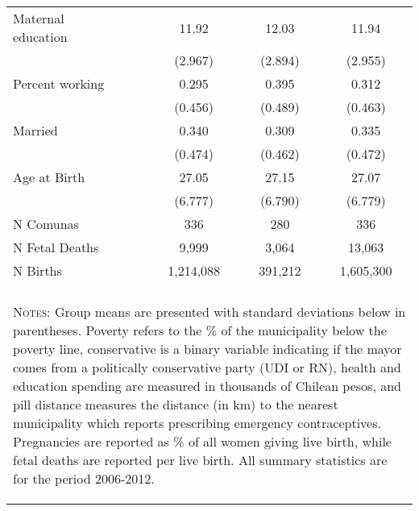 \begin{table}[htpb!]
\begin{tabular} {@{\extracolsep{5pt}}lp{3mm}ccc}
Maternal education  &&       11.92&       12.03&       11.94\\
&&     (2.967)&     (2.894)&     (2.955)\\
Percent working     &&       0.295&       0.395&       0.312\\
&&     (0.456)&     (0.489)&     (0.463)\\
Married     &&       0.340&       0.309&       0.335\\
&&     (0.474)&     (0.462)&     (0.472)\\
Age at Birth      &&       27.05&       27.15&       27.07\\
&&     (6.777)&     (6.790)&     (6.779)\\ \midrule
N Comunas &&336&280&336\\
N Fetal Deaths &&9,999&3,064&13,063\\
N Births &&1,214,088&391,212&1,605,300\\
\hline \hline \\[-1.8ex]
\multicolumn{5}{p{12cm}}{\begin{footnotesize}\textsc{Notes:}
Group means are presented with standard deviations below in
parentheses.  Poverty refers to the \% of the municipality
below the poverty line, conservative is a binary variable
indicating if the mayor comes from a politically conservative
party (UDI or RN), health and education spending are measured
 in thousands of Chilean
pesos, and pill distance measures the distance (in km) to the
nearest municipality which reports prescribing emergency
contraceptives.  Pregnancies are reported as \% of all women
giving live birth, while fetal deaths are reported per live
birth.  All summary statistics are for the period 2006-2012.
\end{footnotesize}} \normalsize\end{tabular}\end{table}
